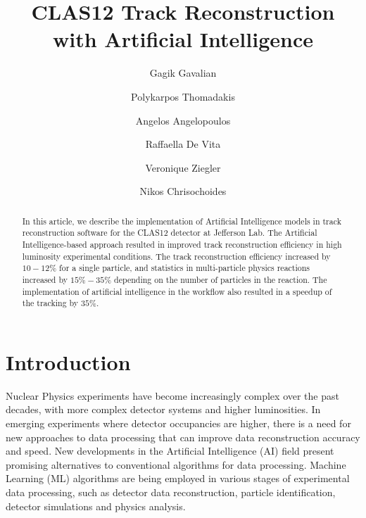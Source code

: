 \documentclass[aps,prl,preprint,12pt]{revtex4}
\begin{document}
\begin{CJK*}{GB}{}
\title{CLAS12 Track Reconstruction with Artificial Intelligence}

\author{Gagik Gavalian}
\author{Polykarpos Thomadakis}
\author{Angelos Angelopoulos}
\author{Raffaella De Vita}
\author{Veronique Ziegler}
\author{Nikos Chrisochoides}

\begin{abstract}
  In this article, we describe the implementation of Artificial Intelligence models in track reconstruction
  software for the CLAS12 detector at Jefferson Lab. The Artificial Intelligence-based approach resulted 
  in improved track reconstruction efficiency in high luminosity experimental conditions.  The track
 reconstruction efficiency increased by $10-12\%$ for a single particle, and statistics in multi-particle physics 
 reactions increased by $15\%-35\%$ depending on the number of particles in the reaction. The implementation 
 of artificial intelligence in the workflow also resulted in a speedup of the tracking by $35\%$. 

\end{abstract}

\maketitle
\end{CJK*}


\section{Introduction}
\indent

Nuclear Physics experiments have become increasingly complex over the past decades, with more complex detector systems and higher luminosities. In emerging experiments where detector occupancies are higher, there is a need for new approaches to data processing that can improve data reconstruction accuracy and speed. New developments in the Artificial Intelligence (AI) field present promising alternatives to conventional algorithms for data processing. Machine Learning (ML) algorithms are being employed in various stages of experimental data processing, such as detector data reconstruction, particle identification, detector simulations and physics analysis. 
\end{document}
